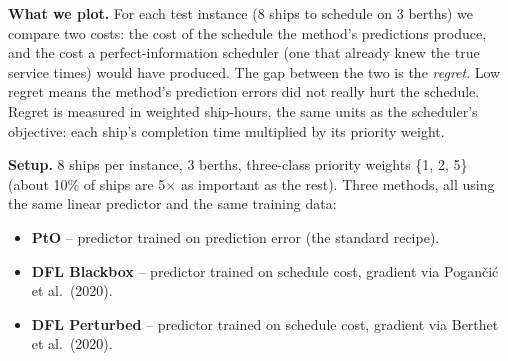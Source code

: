 \documentclass[11pt]{article}
\begin{document}
\noindent
\textbf{What we plot.} For each test instance (8 ships to schedule on
3 berths) we compare two costs: the cost of the schedule the method's
predictions produce, and the cost a perfect-information scheduler
(one that already knew the true service times) would have produced.
The gap between the two is the \emph{regret}. Low regret means the
method's prediction errors did not really hurt the schedule. Regret
is measured in weighted ship-hours, the same units as the scheduler's
objective: each ship's completion time multiplied by its priority
weight.

\textbf{Setup.} 8 ships per instance, 3 berths, three-class priority
weights \{1, 2, 5\} (about 10\% of ships are 5$\times$ as important
as the rest). Three methods, all using the same linear predictor and
the same training data:
\begin{itemize}\setlength{\itemsep}{0pt}
  \item \textbf{PtO} -- predictor trained on prediction error (the
        standard recipe).
  \item \textbf{DFL Blackbox} -- predictor trained on schedule cost,
        gradient via Pogan\v{c}i\'c et al.\ (2020).
  \item \textbf{DFL Perturbed} -- predictor trained on schedule cost,
        gradient via Berthet et al.\ (2020).
\end{itemize}

\vspace{0.5em}
\end{document}
